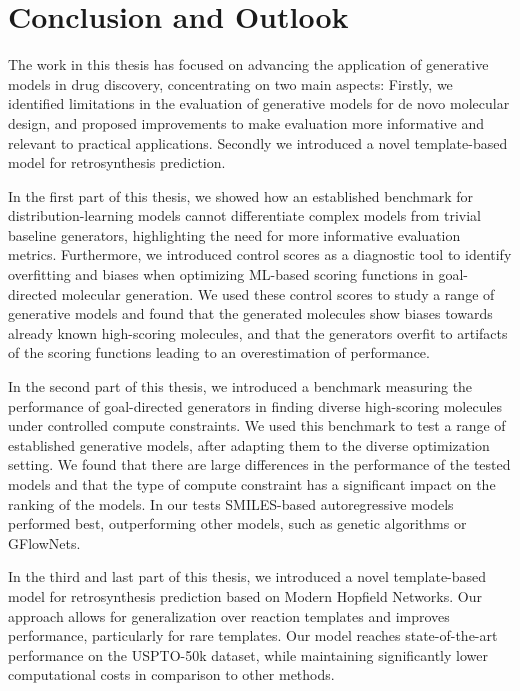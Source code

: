 \chapter{Conclusion and Outlook\label{chap:conclusion}}

The work in this thesis has focused on advancing the application of generative models in drug
discovery, concentrating on two main aspects: Firstly, we identified limitations in the evaluation
of generative models for de novo molecular design, and proposed improvements to make evaluation more
informative and relevant to practical applications. Secondly we introduced a novel template-based
model for retrosynthesis prediction.

In the first part of this thesis, we showed how an established benchmark for distribution-learning
models cannot differentiate complex models from trivial baseline generators, highlighting the need
for more informative evaluation metrics. Furthermore, we introduced control scores as a diagnostic
tool to identify overfitting and biases when optimizing \ac{ML}-based scoring functions in
goal-directed molecular generation. We used these control scores to study a range of generative
models and found that the generated molecules show biases towards already known high-scoring
molecules, and that the generators overfit to artifacts of the scoring functions leading to an
overestimation of performance.

In the second part of this thesis, we introduced a benchmark measuring the performance of
goal-directed generators in finding diverse high-scoring molecules under controlled compute
constraints. We used this benchmark to test a range of established generative models, after adapting
them to the diverse optimization setting. We found that there are large differences in the
performance of the tested models and that the type of compute constraint has a significant impact on
the ranking of the models. In our tests SMILES-based autoregressive models performed best,
outperforming other models, such as genetic algorithms or GFlowNets.

In the third and last part of this thesis, we introduced a novel template-based model for
retrosynthesis prediction based on Modern Hopfield Networks. Our approach allows for generalization
over reaction templates and improves performance, particularly for rare templates. Our model reaches
state-of-the-art performance on the USPTO-50k dataset, while maintaining significantly lower
computational costs in comparison to other methods.

